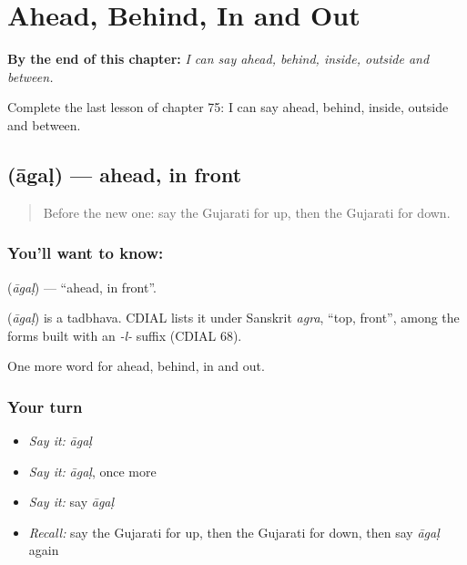
\chapter{Ahead, Behind, In and Out}
\label{ch:gu-ahead-behind-in-and-out}

\begin{chapteropening}
\textbf{By the end of this chapter:} \emph{I can say ahead, behind, inside, outside and between.}

Complete the last lesson of chapter 75: I can say ahead, behind, inside, outside and between.
\end{chapteropening}

\section[\texorpdfstring{\gu{આગળ} (āgaḷ)}{આગળ (āgaḷ)}]{ (āgaḷ) — ahead, in front}

\label{lesson:GU-C75-ahead}



\begin{quote}
Before the new one: say the Gujarati for up, then the Gujarati for down.
\end{quote}

\subsection*{You'll want to know: }
\textbf{} (\emph{āgaḷ}) — \textquotedblleft{}ahead, in front\textquotedblright{}.

\begin{cousinweb}
\textbf{} (\emph{āgaḷ}) is a tadbhava. CDIAL lists it under Sanskrit \emph{agra}, \textquotedblleft{}top, front\textquotedblright{}, among the forms built with an \emph{-l-} suffix (CDIAL 68).
\end{cousinweb}

\begin{grammarlens}[title={What you've built}]
One more word for ahead, behind, in and out.
\end{grammarlens}

\subsection*{Your turn}
\begin{itemize}
\raggedright
  \item \emph{Say it:} \emph{āgaḷ}
  \item \emph{Say it:} \emph{āgaḷ}, once more
  \item \emph{Say it:} say \emph{āgaḷ}
  \item \emph{Recall:} say the Gujarati for up, then the Gujarati for down, then say \emph{āgaḷ} again
\end{itemize}

